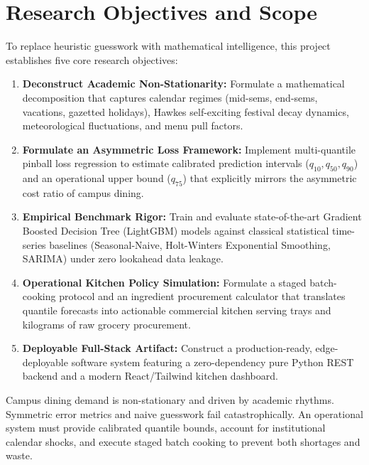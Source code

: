 \documentclass[11pt,a4paper,oneside]{report}
\begin{document}
\section{Research Objectives and Scope}
To replace heuristic guesswork with mathematical intelligence, this project establishes five core research objectives:
\begin{enumerate}
  \item \textbf{Deconstruct Academic Non-Stationarity:} Formulate a mathematical decomposition that captures calendar regimes (mid-sems, end-sems, vacations, gazetted holidays), Hawkes self-exciting festival decay dynamics, meteorological fluctuations, and menu pull factors.
  \item \textbf{Formulate an Asymmetric Loss Framework:} Implement multi-quantile pinball loss regression to estimate calibrated prediction intervals ($q_{10}, q_{50}, q_{90}$) and an operational upper bound ($q_{75}$) that explicitly mirrors the asymmetric cost ratio of campus dining.
  \item \textbf{Empirical Benchmark Rigor:} Train and evaluate state-of-the-art Gradient Boosted Decision Tree (LightGBM) models against classical statistical time-series baselines (Seasonal-Naive, Holt-Winters Exponential Smoothing, SARIMA) under zero lookahead data leakage.
  \item \textbf{Operational Kitchen Policy Simulation:} Formulate a staged batch-cooking protocol and an ingredient procurement calculator that translates quantile forecasts into actionable commercial kitchen serving trays and kilograms of raw grocery procurement.
  \item \textbf{Deployable Full-Stack Artifact:} Construct a production-ready, edge-deployable software system featuring a zero-dependency pure Python REST backend and a modern React/Tailwind kitchen dashboard.
\end{enumerate}

\begin{takeawaybox}
Campus dining demand is non-stationary and driven by academic rhythms. Symmetric error metrics and naive guesswork fail catastrophically. An operational system must provide calibrated quantile bounds, account for institutional calendar shocks, and execute staged batch cooking to prevent both shortages and waste.
\end{takeawaybox}


\end{document}
